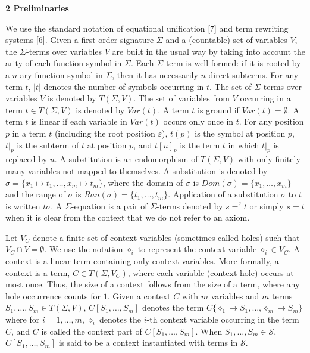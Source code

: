 
 
\par\medskip\noindent\textbf{2 Preliminaries}\par
 
 
We use the standard notation of equational unification [7] and term rewriting systems [6]. Given a first-order signature $\Sigma$ and a (countable) set of variables $V$, the $\Sigma$-terms over variables $V$ are built in the usual way by taking into account the arity of each function symbol in $\Sigma$. Each $\Sigma$-term is well-formed: if it is rooted by a $n$-ary function symbol in $\Sigma$, then it has necessarily $n$ direct subterms. For any term $t$, $|t|$ denotes the number of symbols occurring in $t$. The set of $\Sigma$-terms over variables $V$ is denoted by $T(\Sigma,V)$. The set of variables from $V$ occurring in a term $t\in T(\Sigma,V)$ is denoted by $\mathit{Var}(t)$. A term $t$ is ground if $\mathit{Var}(t)=\emptyset$. A term $t$ is linear if each variable in $\mathit{Var}(t)$ occurs only once in $t$. For any position $p$ in a term $t$ (including the root position $\varepsilon$), $t(p)$ is the symbol at position $p$, $t|_{p}$ is the subterm of $t$ at position $p$, and $t[u]_{p}$ is the term $t$ in which $t|_{p}$ is replaced by $u$. A substitution is an endomorphism of $T(\Sigma,V)$ with only finitely many variables not mapped to themselves. A substitution is denoted by $\sigma=\{x_{1}\mapsto t_{1},\dots,x_{m}\mapsto t_{m}\}$, where the domain of $\sigma$ is $Dom(\sigma)=\{x_{1},\dots,x_{m}\}$ and the range of $\sigma$ is $Ran(\sigma)=\{t_{1},\dots,t_{m}\}$. Application of a substitution $\sigma$ to $t$ is written $t\sigma$. A $\Sigma$-equation is a pair of $\Sigma$-terms denoted by $s=^{?}t$ or simply $s=t$ when it is clear from the context that we do not refer to an axiom.\par
 
 
 
Let $V_{C}$ denote a finite set of context variables (sometimes called holes) such that $V_{C}\cap V=\emptyset$. We use the notation $\diamond_{i}$ to represent the context variable $\diamond_{i}\in V_{C}$. A context is a linear term containing only context variables. More formally, a context is a term, $C\in T(\Sigma,V_{C})$, where each variable (context hole) occurs at most once. Thus, the size of a context follows from the size of a term, where any hole occurrence counts for $1$. Given a context $C$ with $m$ variables and $m$ terms $S_{1},\dots,S_{m}\in T(\Sigma,V)$, $C[S_{1},\dots,S_{m}]$ denotes the term $C\{\diamond_{1}\mapsto S_{1},\dots,\diamond_{m}\mapsto S_{m}\}$ where for $i=1,\dots,m$, $\diamond_{i}$ denotes the $i$-th context variable occurring in the term $C$, and $C$ is called the context part of $C[S_{1},\dots,S_{m}]$. When $S_{1},\dots,S_{m}\in\mathcal{S}$, $C[S_{1},\dots,S_{m}]$ is said to be a context instantiated with terms in $\mathcal{S}$.\par
 
